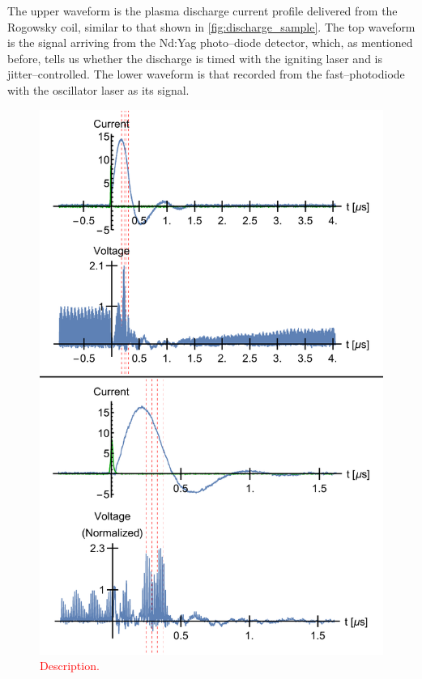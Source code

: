 \documentclass[../main.tex]{subfiles}
\begin{document}
The upper waveform is the plasma discharge current profile delivered from the Rogowsky coil, similar to that shown in \ref{fig:discharge_sample}. The top waveform is the signal arriving from the Nd:Yag photo--diode detector, which, as mentioned before, tells us whether the discharge is timed with the igniting laser and is jitter--controlled. The lower waveform is that recorded from the fast--photodiode with the oscillator laser as its signal.
\begin{figure}
    \centering
    \includegraphics[width=\textwidth]{figures/oscillator/guiding1.pdf}
    \caption{\textcolor{red}{Description.}}
    \label{fig:guiding1}
\end{figure}
\end{document}
